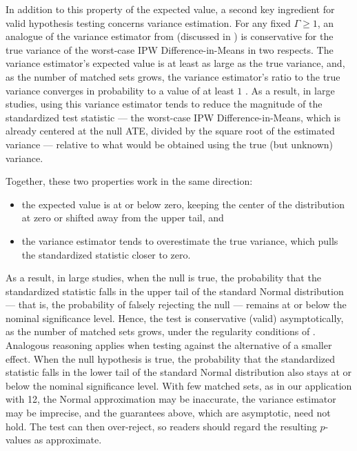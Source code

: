 \documentclass[twoside,11pt]{article}
\def\tightlist{}
\begin{document}
In addition to this property of the expected value, a second key
ingredient for valid hypothesis testing concerns variance estimation.
For any fixed \(\Gamma \geq 1\), an analogue of the variance estimator
from \citet{fogarty2018} (discussed in
) is conservative for the true
variance of the worst-case IPW Difference-in-Means in two respects. The
variance estimator's expected value is at least as large as the true
variance, and, as the number of matched sets grows, the variance
estimator's ratio to the true variance converges in probability to a
value of at least \(1\) \citep[Lemma~2 and p.~2202]{fogarty2023}. As a result, in
large studies, using this variance estimator tends to reduce the magnitude of the standardized test statistic --- the worst-case IPW Difference-in-Means, which is already centered at the null ATE, divided by the square root of the estimated variance --- relative to what would be obtained using the true (but unknown) variance.

Together, these two properties work in the same direction:

\begin{itemize}
\tightlist
\item
  the expected value is at or below zero, keeping the center of the
  distribution at zero or shifted away from the upper tail, and
\item
  the variance estimator tends to overestimate the true variance,
  which pulls the
  standardized statistic closer to zero.
\end{itemize}

As a result, in large studies, when the null is true, the probability that the
standardized statistic falls in the upper tail of the standard Normal
distribution --- that is, the probability of falsely rejecting the null
--- remains at or below the nominal significance level. Hence, the test
is conservative (valid) asymptotically, as the number of matched sets
grows, under the regularity conditions of \citet[Theorem~2]{fogarty2023}. Analogous reasoning applies when
testing against the alternative of a smaller effect. When the null
hypothesis is true, the probability that the standardized statistic falls
in the lower tail of the standard Normal distribution also stays at or
below the nominal significance level. With few matched sets, as in our
application with 12, the Normal approximation may be inaccurate, the
variance estimator may be imprecise, and the guarantees above, which are
asymptotic, need not hold. The test can then over-reject, so readers
should regard the resulting \(p\)-values as approximate.
\end{document}
